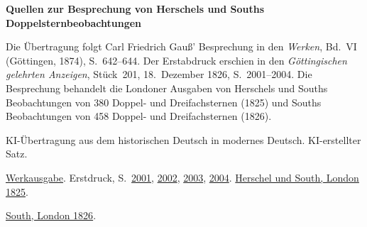 \clearpage\thispagestyle{empty}
\begin{center}\Large\bfseries Quellen zur Besprechung von Herschels und Souths Doppelsternbeobachtungen\end{center}

Die Übertragung folgt Carl Friedrich Gauß’ Besprechung in den \emph{Werken}, Bd.~VI (Göttingen, 1874), S.~642--644. Der Erstabdruck erschien in den \emph{Göttingischen gelehrten Anzeigen}, Stück~201, 18.~Dezember 1826, S.~2001--2004. Die Besprechung behandelt die Londoner Ausgaben von Herschels und Souths Beobachtungen von 380 Doppel- und Dreifachsternen (1825) und Souths Beobachtungen von 458 Doppel- und Dreifachsternen (1826).

KI-Übertragung aus dem historischen Deutsch in modernes Deutsch. KI-erstellter Satz.

\href{https://gdz.sub.uni-goettingen.de/id/PPN236007467}{Werkausgabe}. Erstdruck, S.~\href{https://images.p.sub.uni-goettingen.de/iiif/image/gdz:PPN385030444_1826_3:00000619/full/1650,/0/default.jpg}{2001}, \href{https://images.p.sub.uni-goettingen.de/iiif/image/gdz:PPN385030444_1826_3:00000620/full/1650,/0/default.jpg}{2002}, \href{https://images.p.sub.uni-goettingen.de/iiif/image/gdz:PPN385030444_1826_3:00000621/full/1650,/0/default.jpg}{2003}, \href{https://images.p.sub.uni-goettingen.de/iiif/image/gdz:PPN385030444_1826_3:00000622/full/1650,/0/default.jpg}{2004}. \href{https://www.huntington.org/collections/lib-751861}{Herschel und South, London 1825}.

\href{https://www.huntington.org/collections/lib-751860}{South, London 1826}.

\clearpage
